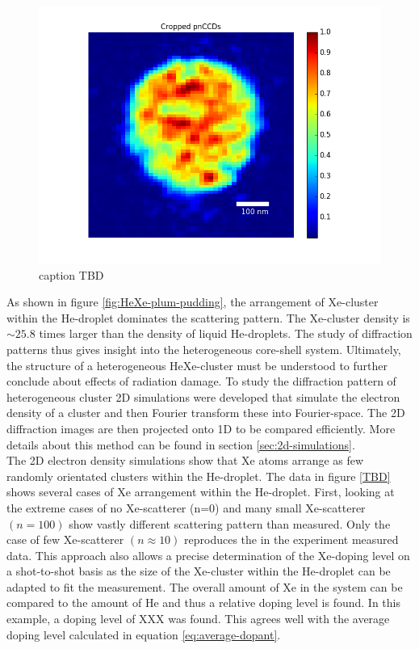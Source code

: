 \begin{figure}
 	\centering
 		\includegraphics[width=1.00\textwidth]{images/results/HeXe_60_TD_800_fs.png}
 	\caption{caption TBD}
 	\label{fig:HeXe-cluster-60}
\end{figure}
As shown in figure \ref{fig:HeXe-plum-pudding}, the arrangement of Xe-cluster within the He-droplet dominates the scattering pattern. The Xe-cluster density is $\sim 25.8$ times larger than the density of liquid He-droplets. The study of diffraction patterns thus gives insight into the heterogeneous core-shell system. Ultimately, the structure of a heterogeneous HeXe-cluster must be understood to further conclude about effects of radiation damage. To study the diffraction pattern of heterogeneous cluster 2D simulations were developed that simulate the electron density of a cluster and then Fourier transform these into Fourier-space. The 2D diffraction images are then projected onto 1D to be compared efficiently. More details about this method can be found in section \ref{sec:2d-simulations}.\\
The 2D electron density simulations show that Xe atoms arrange as few randomly orientated clusters within the He-droplet. The data in figure \ref{TBD} shows several cases of Xe arrangement within the He-droplet. First, looking at the extreme cases of no Xe-scatterer (n=0) and many small Xe-scatterer $(n=100)$ show vastly different scattering pattern than measured. Only the case of few Xe-scatterer $(n\approx 10)$ reproduces the in the experiment measured data. This approach also allows a precise determination of the Xe-doping level on a shot-to-shot basis as the size of the Xe-cluster within the He-droplet can be adapted to fit the measurement. The overall amount of Xe in the system can be compared to the amount of He and thus a relative doping level is found. In this example, a doping level of XXX was found. This agrees well with the average doping level calculated in equation \eqref{eq:average-dopant}.\\

